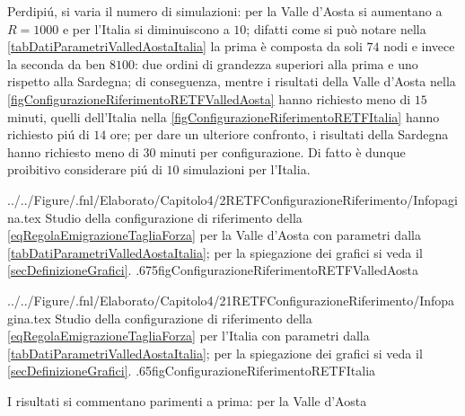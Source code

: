       Perdipiú, si varia il numero di simulazioni: per la Valle d'Aosta si aumentano a \(R=1000\) e per l'Italia si diminuiscono a \(10\); difatti come si può notare nella \cref{tabDatiParametriValledAostaItalia} la prima è composta da soli \(74\) nodi e invece la seconda da ben \(8100\): due ordini di grandezza superiori alla prima e uno rispetto alla Sardegna; di conseguenza, mentre i risultati della Valle d'Aosta nella \cref{figConfigurazioneRiferimentoRETFValledAosta} hanno richiesto meno di \(15\) minuti, quelli dell'Italia nella \cref{figConfigurazioneRiferimentoRETFItalia} hanno richiesto piú di \(14\) ore; per dare un ulteriore confronto, i risultati della Sardegna hanno richiesto meno di \(30\) minuti per configurazione. Di fatto è dunque proibitivo considerare piú di \(10\) simulazioni per l'Italia.

        {../../Figure/.fnl/Elaborato/Capitolo4/2RETFConfigurazioneRiferimento/Infopagina.tex}
        {Studio della configurazione di riferimento della \ref{eqRegolaEmigrazioneTagliaForza} per la Valle d'Aosta con parametri dalla \cref{tabDatiParametriValledAostaItalia}; per la spiegazione dei grafici si veda il \cref{secDefinizioneGrafici}.}
        {.675\linewidth}{figConfigurazioneRiferimentoRETFValledAosta}

        {../../Figure/.fnl/Elaborato/Capitolo4/21RETFConfigurazioneRiferimento/Infopagina.tex}
        {Studio della configurazione di riferimento della \ref{eqRegolaEmigrazioneTagliaForza} per l'Italia con parametri dalla \cref{tabDatiParametriValledAostaItalia}; per la spiegazione dei grafici si veda il \cref{secDefinizioneGrafici}.}
        {.65\linewidth}{figConfigurazioneRiferimentoRETFItalia}

      I risultati si commentano parimenti a prima: per la Valle d'Aosta

